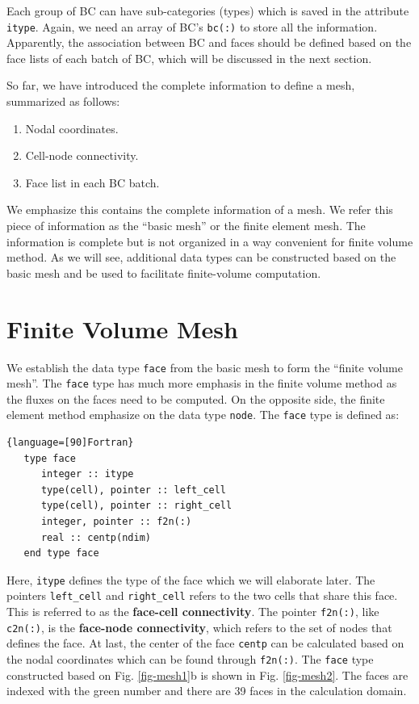 \documentclass[12pt, letterpaper]{report}
\begin{document}
Each group of BC can have sub-categories (types) which is saved in the attribute \verb+itype+.
Again, we need an array of BC's \verb+bc(:)+ to store all the information. Apparently, the
association between BC and faces should be defined based on the face lists of each batch of BC,
which will be discussed in the next section.
\paraspace

So far, we have introduced the complete information to define a mesh, summarized as follows:

\begin{enumerate}
   \item Nodal coordinates.
   \item Cell-node connectivity.
   \item Face list in each BC batch.
\end{enumerate}

We emphasize this contains the complete information of a mesh. We refer this piece of information as
the ``basic mesh'' or the finite element mesh. The information is complete but is not organized in a
way convenient for finite volume method. As we will see, additional data types can be constructed
based on the basic mesh and be used to facilitate finite-volume computation. 
\paraspace

\section{Finite Volume Mesh} \label{c1s2}

We establish the data type \verb+face+ from the basic mesh to form the ``finite volume mesh''. The
\verb+face+ type has much more emphasis in the finite volume method as the fluxes on the faces need
to be computed. On the opposite side, the finite element method emphasize on the data type
\verb+node+. The \verb+face+ type is defined as:

\begin{lstlisting}{language=[90]Fortran}
   type face
      integer :: itype
      type(cell), pointer :: left_cell
      type(cell), pointer :: right_cell
      integer, pointer :: f2n(:)
      real :: centp(ndim)
   end type face
\end{lstlisting}

Here, \verb+itype+ defines the type of the face which we will elaborate later. The pointers
\verb+left_cell+ and \verb+right_cell+ refers to the two cells that share this face. This is
referred to as the {\bf face-cell connectivity}. The pointer \verb+f2n(:)+, like \verb+c2n(:)+, is
the {\bf face-node connectivity}, which refers to the set of nodes that defines the face. At last,
the center of the face \verb+centp+ can be calculated based on the nodal coordinates which can be
found through \verb+f2n(:)+. The \verb+face+ type constructed based on Fig. \ref{fig-mesh1}b is
shown in Fig. \ref{fig-mesh2}. The faces are indexed with the green number and there are 39 faces in
the calculation domain.
\end{document}
